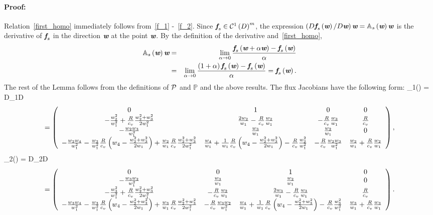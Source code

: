 \paragraph{Proof:}
Relation~\eqref{first_homo} immediately follows from~\eqref{f_1} -~\eqref{f_2}. Since $\textit{\textbf{f}}_s\in \mathcal{C}^1\left( D\right)^m$, the expression $\left( D \textit{\textbf{f}}_s\left(\textit{\textbf{w}}\right)/ D \textit{\textbf{w}}\right) \textit{\textbf{w}} = \mathbb{A}_s\left(\textit{\textbf{w}}\right)\textit{\textbf{w}}$ is the derivative of $\textit{\textbf{f}}_s$ in the direction $\textit{\textbf{w}}$ at the point $\textit{\textbf{w}}$. By the definition of the derivative and~\eqref{first_homo},
\begin{eqnarray}
\mathbb{A}_s\left(\textit{\textbf{w}}\right)\textit{\textbf{w}} & = & \lim_{\alpha\rightarrow 0}\frac{\textit{\textbf{f}}_s\left(\textit{\textbf{w}} + \alpha\textit{\textbf{w}}\right) - \textit{\textbf{f}}_s\left(\textit{\textbf{w}}\right)}{\alpha}\\
& = & \lim_{\alpha\rightarrow 0}\frac{\left( 1 + \alpha\right) \textit{\textbf{f}}_s\left(\textit{\textbf{w}}\right) - \textit{\textbf{f}}_s\left(\textit{\textbf{w}}\right)}{\alpha} = \textit{\textbf{f}}_s\left(\textit{\textbf{w}}\right).
\end{eqnarray}
The rest of the Lemma follows from the definitions of $\mathcal{P}$ and $\mathbb{P}$ and the above results.
The flux Jacobians have the following form:
\be
\nonumber
  _1({}) = {D{}_1\over D {}}
\ee
\scriptsize
\begin{eqnarray}
\nonumber
= \left( \begin{array}{cccc} 0 & 1 & 0 & 0\\ -{w_2^2\over w_1^2} +{R\over c_v}{w_2^2+w_3^2\over 2 w_1^2} & {2w_2\over w_1}-{R\over c_v}{w_2\over w_1} & -{R\over c_v}{w_3\over w_1} & {R\over c_v}\\ -{w_2w_3\over w_1^2} & {w_3\over w_1} & {w_2\over w_1} & 0 \\ -{w_2w_4\over w_1^2}-{w_2\over w_1^2}{R\over c_v} \left(w_4-{w_2^2+w_3^2\over 2 w_1}\right) +{w_2\over w_1}{R\over c_v}{w_2^2+w_3^2\over 2 w_1^2} & {w_4\over w_1}+{1\over w_1}{R\over c_v} \left(w_4-{w_2^2+w_3^2\over 2 w_1}\right) -{R\over c_v}{w_2^2\over w_1^2} & -{R\over c_v}{w_2w_3\over w_1^2} & {w_2\over w_1}+{R\over c_v}{w_2\over w_1} \\ \end{array} \right),
\end{eqnarray}
\normalsize
\be
\nonumber
{}_2({}) = {D{}_2\over D {}}
\ee
\scriptsize
\begin{eqnarray}
\nonumber
= \left( \begin{array}{cccc} 0 & 0 & 1 & 0\\ -{w_3w_2\over w_1^2} & {w_3\over w_1} & {w_2\over w_1} & 0 \\ -{w_3^2\over w_1^2} +{R\over c_v}{w_2^2+w_3^2\over 2 w_1^2} & -{R\over c_v}{w_2\over w_1} & {2w_3\over w_1} -{R\over c_v}{w_3\over w_1} & {R\over c_v}\\ -{w_3w_4\over w_1^2}-{w_3\over w_1^2}{R\over c_v} \left(w_4-{w_2^2+w_3^2\over 2 w_1}\right) +{w_3\over w_1}{R\over c_v}{w_2^2+w_3^2\over 2 w_1^2}& -{R\over c_v}{w_3w_2\over w_1^2} & {w_4\over w_1}+{1\over w_1}{R\over c_v} \left(w_4-{w_2^2+w_3^2\over 2 w_1}\right) -{R\over c_v}{w_3^2\over w_1^2} & {w_3\over w_1}+{R\over c_v}{w_3\over w_1} \\ \end{array} \right).
\end{eqnarray}
\normalsize

